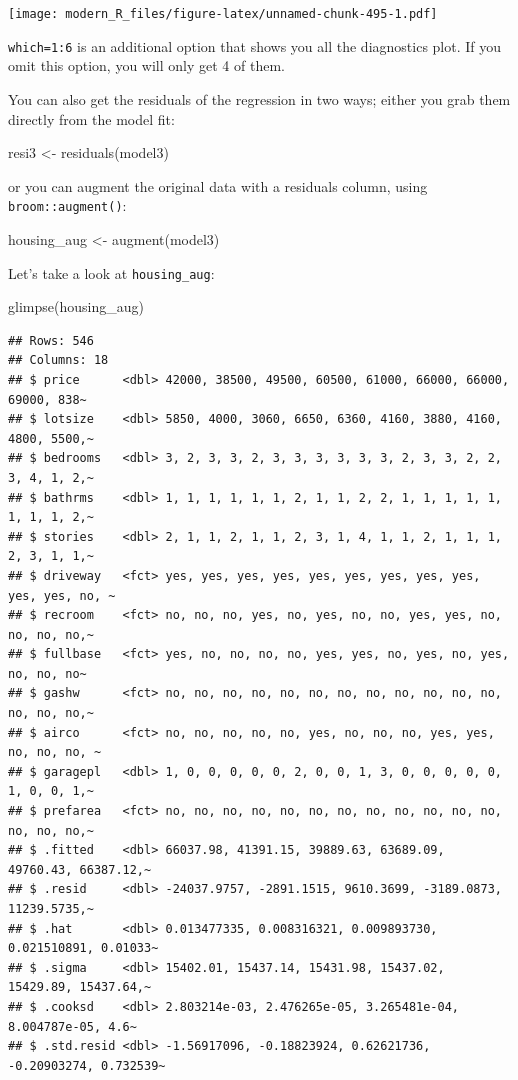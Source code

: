 \documentclass[
]{article}
\newenvironment{Shaded}{\begin{snugshade}}{\end{snugshade}}
\newcommand{\FunctionTok}[1]{\textcolor[rgb]{0.00,0.00,0.00}{#1}}
\newcommand{\NormalTok}[1]{#1}
\newcommand{\OtherTok}[1]{\textcolor[rgb]{0.56,0.35,0.01}{#1}}
\begin{document}
\texttt{[image: modern\_R\_files/figure-latex/unnamed-chunk-495-1.pdf]}

\texttt{which=1:6} is an additional option that shows you all the diagnostics plot. If you omit this
option, you will only get 4 of them.

You can also get the residuals of the regression in two ways; either you grab them directly from
the model fit:

\begin{Shaded}
\begin{Highlighting}[]
\NormalTok{resi3 }\OtherTok{\textless{}{-}} \FunctionTok{residuals}\NormalTok{(model3)}
\end{Highlighting}
\end{Shaded}

or you can augment the original data with a residuals column, using \texttt{broom::augment()}:

\begin{Shaded}
\begin{Highlighting}[]
\NormalTok{housing\_aug }\OtherTok{\textless{}{-}} \FunctionTok{augment}\NormalTok{(model3)}
\end{Highlighting}
\end{Shaded}

Let's take a look at \texttt{housing\_aug}:

\begin{Shaded}
\begin{Highlighting}[]
\FunctionTok{glimpse}\NormalTok{(housing\_aug)}
\end{Highlighting}
\end{Shaded}

\begin{verbatim}
## Rows: 546
## Columns: 18
## $ price      <dbl> 42000, 38500, 49500, 60500, 61000, 66000, 66000, 69000, 838~
## $ lotsize    <dbl> 5850, 4000, 3060, 6650, 6360, 4160, 3880, 4160, 4800, 5500,~
## $ bedrooms   <dbl> 3, 2, 3, 3, 2, 3, 3, 3, 3, 3, 3, 2, 3, 3, 2, 2, 3, 4, 1, 2,~
## $ bathrms    <dbl> 1, 1, 1, 1, 1, 1, 2, 1, 1, 2, 2, 1, 1, 1, 1, 1, 1, 1, 1, 2,~
## $ stories    <dbl> 2, 1, 1, 2, 1, 1, 2, 3, 1, 4, 1, 1, 2, 1, 1, 1, 2, 3, 1, 1,~
## $ driveway   <fct> yes, yes, yes, yes, yes, yes, yes, yes, yes, yes, yes, no, ~
## $ recroom    <fct> no, no, no, yes, no, yes, no, no, yes, yes, no, no, no, no,~
## $ fullbase   <fct> yes, no, no, no, no, yes, yes, no, yes, no, yes, no, no, no~
## $ gashw      <fct> no, no, no, no, no, no, no, no, no, no, no, no, no, no, no,~
## $ airco      <fct> no, no, no, no, no, yes, no, no, no, yes, yes, no, no, no, ~
## $ garagepl   <dbl> 1, 0, 0, 0, 0, 0, 2, 0, 0, 1, 3, 0, 0, 0, 0, 0, 1, 0, 0, 1,~
## $ prefarea   <fct> no, no, no, no, no, no, no, no, no, no, no, no, no, no, no,~
## $ .fitted    <dbl> 66037.98, 41391.15, 39889.63, 63689.09, 49760.43, 66387.12,~
## $ .resid     <dbl> -24037.9757, -2891.1515, 9610.3699, -3189.0873, 11239.5735,~
## $ .hat       <dbl> 0.013477335, 0.008316321, 0.009893730, 0.021510891, 0.01033~
## $ .sigma     <dbl> 15402.01, 15437.14, 15431.98, 15437.02, 15429.89, 15437.64,~
## $ .cooksd    <dbl> 2.803214e-03, 2.476265e-05, 3.265481e-04, 8.004787e-05, 4.6~
## $ .std.resid <dbl> -1.56917096, -0.18823924, 0.62621736, -0.20903274, 0.732539~
\end{verbatim}
\end{document}
